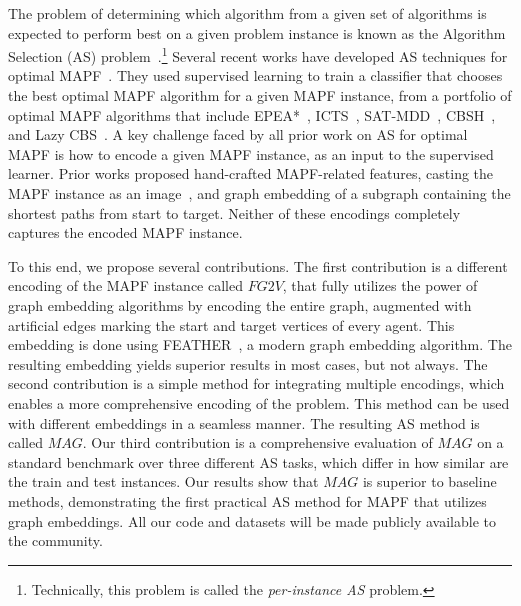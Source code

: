 \documentclass[letterpaper]{article} %
\newcommand{\Carmel}[1]{}
\newcommand{\Roni}[1]{}
\newcommand{\fgtv}[1]{\ensuremath{\textit{FG2V}}\xspace}
\newcommand{\mapfgas}[1]{\ensuremath{\textit{MAG}}\xspace}
\begin{document}
The problem of determining which algorithm from a given set of algorithms is expected to perform best on a given problem instance is known as the 
Algorithm Selection (AS) problem~\cite{rice1976algorithm,kerschke2019automated}.\footnote{Technically, this problem is called the \emph{per-instance AS} problem.}
Several recent works have developed AS techniques for optimal MAPF~\cite{kaduri2020algorithm,ren2021mapfast,alkazzi2022mapfaster}. 
They used supervised learning to
train a classifier that chooses the best optimal MAPF algorithm for a given MAPF instance, from a portfolio of optimal MAPF algorithms that include EPEA*~\cite{goldenberg2014enhanced}, ICTS~\cite{sharon2013increasing}, SAT-MDD~\cite{surynek2016efficient}, CBSH~\cite{felner2018adding}, and Lazy CBS~\cite{gange2019lazy}.  
A key challenge faced by all prior work on AS for optimal MAPF is how to encode a given MAPF instance, as an input to the supervised learner. Prior works proposed hand-crafted MAPF-related features, casting the MAPF instance as an image~\cite{alkazzi2022mapfaster}, and graph embedding of a subgraph containing the shortest paths from start to target. Neither of these encodings completely captures the encoded MAPF instance.



To this end, we propose several contributions. 
The first contribution is a different encoding of the MAPF instance called \fgtv\ , that fully utilizes the power of graph embedding algorithms by encoding the entire graph, augmented with artificial edges marking the start and target vertices of every agent. 
This embedding is done using FEATHER~\cite{rozemberczki2020characteristic}, a modern graph embedding algorithm. %
The resulting embedding yields superior results in most cases, but not always. 
The second contribution is a simple method for integrating multiple encodings, which enables a more comprehensive encoding of the problem. This method can be used with different embeddings in a seamless manner. The resulting AS method is called \mapfgas\ . 
Our third contribution is a comprehensive evaluation of \mapfgas\ on a standard benchmark over three different AS tasks, which differ in how similar are the train and test instances. Our results show that \mapfgas\ is superior to baseline methods, demonstrating the first practical AS method for MAPF that utilizes graph embeddings. All our code and datasets will be made publicly available to the community. 
\end{document}

